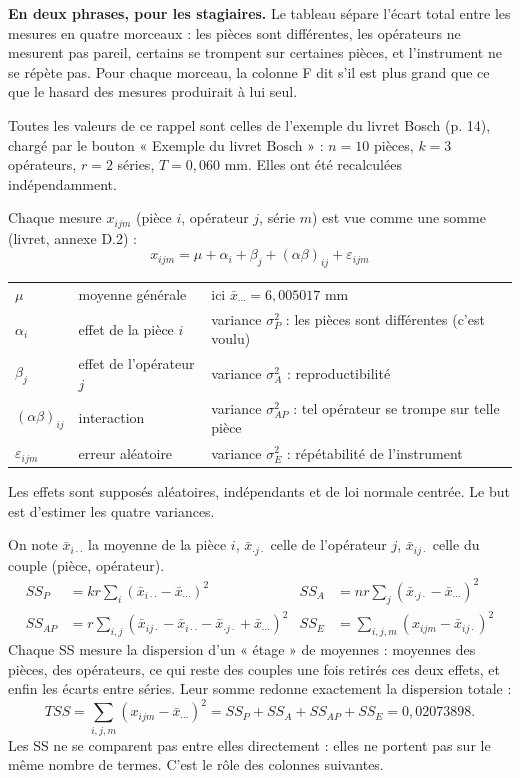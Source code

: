\documentclass[10pt,a4paper]{article}
\begin{document}
\thispagestyle{fancy}

\begin{tcolorbox}[boite]
\textbf{En deux phrases, pour les stagiaires.} Le tableau sépare l'écart total entre les mesures en quatre morceaux : les pièces sont différentes, les opérateurs ne mesurent pas pareil, certains se trompent sur certaines pièces, et l'instrument ne se répète pas. Pour chaque morceau, la colonne F dit s'il est plus grand que ce que le hasard des mesures produirait à lui seul.
\end{tcolorbox}

Toutes les valeurs de ce rappel sont celles de l'exemple du livret Bosch (p. 14), chargé par le bouton « Exemple du livret Bosch » : $n = 10$ pièces, $k = 3$ opérateurs, $r = 2$ séries, $T = 0{,}060$ mm. Elles ont été recalculées indépendamment.

Chaque mesure $x_{ijm}$ (pièce $i$, opérateur $j$, série $m$) est vue comme une somme (livret, annexe D.2) :
\[x_{ijm}=\mu+\alpha_i+\beta_j+(\alpha\beta)_{ij}+\varepsilon_{ijm}\]
\begin{tabularx}{\linewidth}{@{}l l X@{}}
$\mu$ & moyenne générale & ici $\bar x_{\cdots} = 6{,}005017$ mm\\
$\alpha_i$ & effet de la pièce $i$ & variance $\sigma_P^2$ : les pièces sont différentes (c'est voulu)\\
$\beta_j$ & effet de l'opérateur $j$ & variance $\sigma_A^2$ : reproductibilité\\
$(\alpha\beta)_{ij}$ & interaction & variance $\sigma_{AP}^2$ : tel opérateur se trompe sur telle pièce\\
$\varepsilon_{ijm}$ & erreur aléatoire & variance $\sigma_E^2$ : répétabilité de l'instrument\\
\end{tabularx}


Les effets sont supposés aléatoires, indépendants et de loi normale centrée. Le but est d'estimer les quatre variances.

On note $\bar x_{i\cdot\cdot}$ la moyenne de la pièce $i$, $\bar x_{\cdot j\cdot}$ celle de l'opérateur $j$, $\bar x_{ij\cdot}$ celle du couple (pièce, opérateur).
\begin{align*}
SS_P&=kr\sum_i(\bar x_{i\cdot\cdot}-\bar x_{\cdots})^2 & SS_A&=nr\sum_j(\bar x_{\cdot j\cdot}-\bar x_{\cdots})^2\\
SS_{AP}&=r\sum_{i,j}(\bar x_{ij\cdot}-\bar x_{i\cdot\cdot}-\bar x_{\cdot j\cdot}+\bar x_{\cdots})^2 & SS_E&=\sum_{i,j,m}(x_{ijm}-\bar x_{ij\cdot})^2
\end{align*}
Chaque SS mesure la dispersion d'un « étage » de moyennes : moyennes des pièces, des opérateurs, ce qui reste des couples une fois retirés ces deux effets, et enfin les écarts entre séries. Leur somme redonne exactement la dispersion totale :
\[TSS=\sum_{i,j,m}(x_{ijm}-\bar x_{\cdots})^2=SS_P+SS_A+SS_{AP}+SS_E=0{,}02073898.\]
{\small Les SS ne se comparent pas entre elles directement : elles ne portent pas sur le même nombre de termes. C'est le rôle des colonnes suivantes.}
\end{document}
